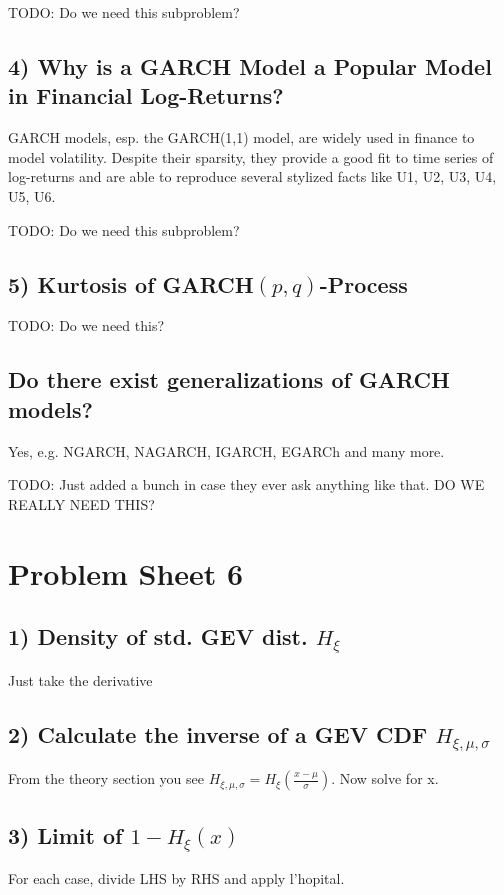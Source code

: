 TODO: Do we need this subproblem?

%
%
\subsection*{4) Why is a GARCH Model a Popular Model in Financial Log-Returns?}
GARCH models, esp. the GARCH(1,1) model, are widely used in finance to model volatility. Despite their sparsity, they provide a good fit to time series of log-returns and are able to reproduce several stylized facts like U1, U2, U3, U4, U5, U6.

TODO: Do we need this subproblem?

%
%
\subsection*{5) Kurtosis of GARCH$(p,q)$-Process}
TODO: Do we need this?

%
%
\subsection*{Do there exist generalizations of GARCH models?}
Yes, e.g. NGARCH, NAGARCH, IGARCH, EGARCh and many more.

TODO: Just added a bunch in case they ever ask anything like that. DO WE REALLY NEED THIS?

%
%
\section*{Problem Sheet 6}
%
%
\subsection*{1) Density of std. GEV dist. $H_\xi$}
Just take the derivative

%
%
\subsection*{2) Calculate the inverse of a GEV CDF $H_{\xi, \mu, \sigma}$}
From the theory section you see $H_{\xi,\mu,\sigma} = H_\xi(\frac{x-\mu}{\sigma})$. Now solve for x.

%
%
\subsection*{3) Limit of $1 - H_\xi(x)$}
For each case, divide LHS by RHS and apply l'hopital.

